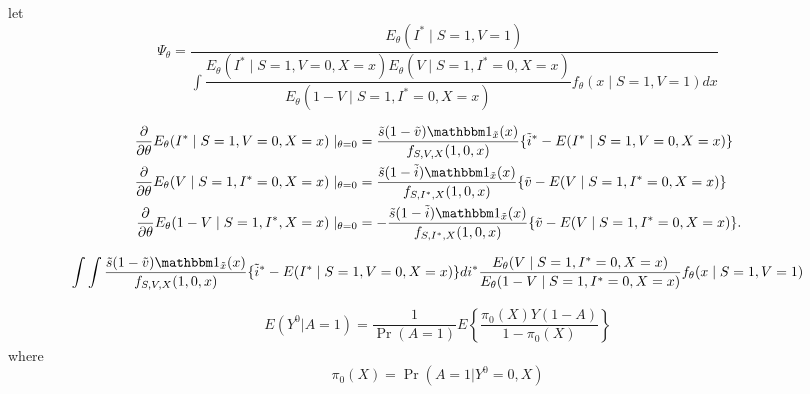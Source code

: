 \documentclass{article}
\begin{document}



\newpage
let
$$\Psi_\theta = \dfrac{E_\theta(I^*\mid S=1, V=1)}{\int \dfrac{E_\theta(I^*\mid S=1, V=0, X=x)E_\theta(V \mid S=1, I^*=0, X=x)}{E_\theta(1-V\mid S=1, I^*=0, X=x)}f_\theta(x\mid S=1, V=1)dx}$$

\begin{align*}
    \dfrac{\partial}{\partial\theta}E_\theta(I^*\mid S=1, V=0, X=x)\mid_{\theta=0} &= \dfrac{\tilde s(1-\tilde v)\mathbbm 1_{\tilde x}(x)}{f_{S, V, X}(1, 0, x)}\{\tilde i^* - E(I^*\mid S=1, V=0, X=x)\}\\
     \dfrac{\partial}{\partial\theta}E_\theta(V \mid S=1, I^*=0, X=x)\mid_{\theta=0} &= \dfrac{\tilde s(1-\tilde i)\mathbbm 1_{\tilde x}(x)}{f_{S, I^*, X}(1, 0, x)}\{\tilde v - E(V\mid S=1, I^*=0, X=x)\}\\
     \dfrac{\partial}{\partial\theta}E_\theta(1-V\mid S=1, I^*, X=x)\mid_{\theta=0} &= -\dfrac{\tilde s(1 - \tilde i)\mathbbm 1_{\tilde x}(x)}{f_{S, I^*, X}(1, 0, x)}\{\tilde v - E(V\mid S=1, I^*=0, X=x)\}.
\end{align*}

\begin{align*}
\int \int \dfrac{\tilde s(1-\tilde v)\mathbbm 1_{\tilde x}(x)}{f_{S, V, X}(1, 0, x)}\{\tilde i^* - E(I^*\mid S=1, V=0, X=x)\}di^* \dfrac{E_\theta(V \mid S=1, I^*=0, X=x)}{E_\theta(1-V\mid S=1, I^*=0, X=x)}f_\theta(x\mid S=1, V=1)   
\end{align*}


\newpage

\begin{align*}
    E(Y^0 | A = 1) = \dfrac{1}{\Pr(A = 1)} E\left\{\dfrac{\pi_0(X)Y(1-A)}{1-\pi_0(X)}\right\}
\end{align*}
where 
\begin{equation*}
    \pi_0(X) = \Pr(A = 1 | Y^0=0, X)
\end{equation*}
\end{document}
